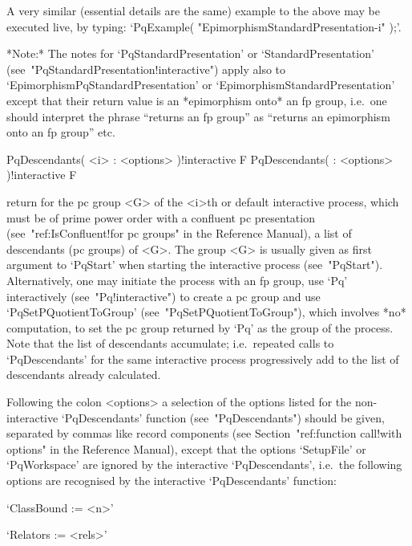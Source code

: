 A very similar (essential details are the same) example to the above may
be executed live, by typing:
`PqExample( "EpimorphismStandardPresentation-i" );'.

*Note:*
The  notes   for   `PqStandardPresentation'   or   `StandardPresentation'
(see~"PqStandardPresentation!interactive")      apply       also       to
`EpimorphismPqStandardPresentation' or  `EpimorphismStandardPresentation'
except that their return value is an  *epimorphism  onto*  an  fp  group,
i.e.~one should interpret the phrase ``returns an fp group'' as ``returns
an epimorphism onto an fp group'' etc.

\>PqDescendants( <i> : <options> )!{interactive} F
\>PqDescendants( : <options> )!{interactive} F

return for the pc group <G> of the <i>th or default interactive  {\ANUPQ}
process, which  must  be  of  prime  power  order  with  a  confluent  pc
presentation (see~"ref:IsConfluent!for pc groups" in the {\GAP} Reference
Manual), a list of descendants (pc groups)  of  <G>.  The  group  <G>  is
usually  given  as  first  argument  to  `PqStart'  when   starting   the
interactive {\ANUPQ}  process  (see~"PqStart").  Alternatively,  one  may
initiate  the  process  with  an  fp  group,   use   `Pq'   interactively
(see~"Pq!interactive")    to    create    a    pc    group    and     use
`PqSetPQuotientToGroup'  (see~"PqSetPQuotientToGroup"),  which   involves
*no* computation, to set the pc group returned by `Pq' as  the  group  of
the process. Note that the list of descendants accumulate;  i.e.~repeated
calls to  `PqDescendants'  for  the  same  interactive  {\ANUPQ}  process
progressively add to the list of descendants already calculated.

Following the colon <options> a selection of the options listed  for  the
non-interactive `PqDescendants' function (see~"PqDescendants") should  be
given,   separated   by    commas    like    record    components    (see
Section~"ref:function call!with options" in the {\GAP} Reference Manual),
except that the options `SetupFile' or `PqWorkspace' are ignored  by  the
interactive `PqDescendants', i.e.~the following options are recognised by
the interactive `PqDescendants' function:

\beginlist%

\item{}`ClassBound := <n>'

\item{}`Relators := <rels>'

